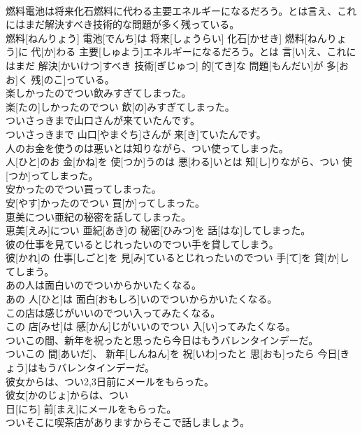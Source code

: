 \documentclass[8pt]{extreport}
\begin{document}
\begin{CJK}{UTF8}{min}
\\	燃料電池は将来化石燃料に代わる主要エネルギーになるだろう。とは言え、これにはまだ解決すべき技術的な問題が多く残っている。	
\\	燃料[ねんりょう] 電池[でんち]は 将来[しょうらい] 化石[かせき] 燃料[ねんりょう]に 代[か]わる 主要[しゅよう]エネルギーになるだろう。とは 言[い]え、これにはまだ 解決[かいけつ]すべき 技術[ぎじゅつ] 的[てき]な 問題[もんだい]が 多[おお]く 残[のこ]っている。
\\	楽しかったのでつい飲みすぎてしまった。	
\\	楽[たの]しかったのでつい 飲[の]みすぎてしまった。
\\	ついさっきまで山口さんが来ていたんです。	
\\	ついさっきまで 山口[やまぐち]さんが 来[き]ていたんです。
\\	人のお金を使うのは悪いとは知りながら、つい使ってしまった。	
\\	人[ひと]のお 金[かね]を 使[つか]うのは 悪[わる]いとは 知[し]りながら、つい 使[つか]ってしまった。
\\	安かったのでつい買ってしまった。	
\\	安[やす]かったのでつい 買[か]ってしまった。
\\	恵美につい亜紀の秘密を話してしまった。	
\\	恵美[えみ]につい 亜紀[あき]の 秘密[ひみつ]を 話[はな]してしまった。
\\	彼の仕事を見ているとじれったいのでつい手を貸してしまう。	
\\	彼[かれ]の 仕事[しごと]を 見[み]ているとじれったいのでつい 手[て]を 貸[か]してしまう。
\\	あの人は面白いのでついからかいたくなる。	
\\	あの 人[ひと]は 面白[おもしろ]いのでついからかいたくなる。
\\	この店は感じがいいのでつい入ってみたくなる。	
\\	この 店[みせ]は 感[かん]じがいいのでつい 入[い]ってみたくなる。
\\	ついこの間、新年を祝ったと思ったら今日はもうバレンタインデーだ。	
\\	ついこの 間[あいだ]、 新年[しんねん]を 祝[いわ]ったと 思[おも]ったら 今日[きょう]はもうバレンタインデーだ。
\\	彼女からは、つい2,3日前にメールをもらった。	
\\	彼女[かのじょ]からは、つい 
\\	日[にち] 前[まえ]にメールをもらった。
\\	ついそこに喫茶店がありますからそこで話しましょう。	

\end{CJK}
\end{document}
